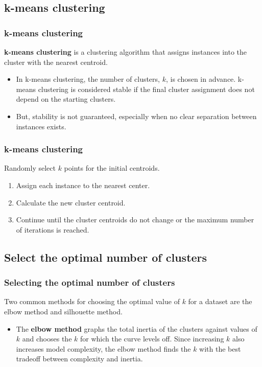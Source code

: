 \documentclass[10pt,dvipsnames]{beamer}
\begin{document}
\subsection{k-means clustering}
\begin{frame}
    \frametitle{k-means clustering}
    \textbf{k-means clustering} is a clustering algorithm that assigns instances into the cluster with the nearest centroid.
    \begin{itemize}
        \item In k-means clustering, the number of clusters, \(k\), is chosen in advance. k-means clustering is considered stable if the final cluster assignment does not depend on the starting clusters.
        \item But, stability is not guaranteed, especially when no clear separation between instances exists.
    \end{itemize}
\end{frame}

\begin{frame}
    \frametitle{k-means clustering}

    Randomly select $k$ points for the initial centroids.
    \begin{enumerate}
        \item Assign each instance to the nearest center.
        \item Calculate the new cluster centroid.
        \item Continue until the cluster centroids do not change or the maximum number of iterations is reached.
    \end{enumerate}
\end{frame}

\subsection{Select the optimal number of clusters}
\begin{frame}
    \frametitle{Selecting the optimal number of clusters}
    Two common methods for choosing the optimal value of $k$ for a dataset are the elbow method and silhouette method.
    \begin{itemize}
        \item The \textbf{elbow method} graphs the total inertia of the clusters against values of $k$ and chooses the $k$ for which the curve levels off. Since increasing $k$ also increases model complexity, the elbow method finds the $k$ with the best tradeoff between complexity and inertia.
    \end{itemize}
\end{frame}
\end{document}
